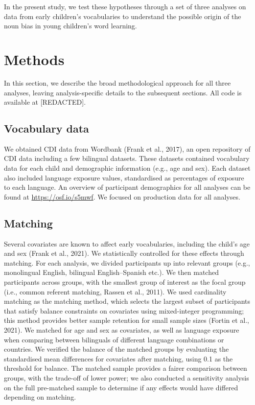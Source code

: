 \documentclass[10pt, letterpaper]{article}
\begin{document}
In the present study, we test these hypotheses through a set of three
analyses on data from early children's vocabularies to understand the
possible origin of the noun bias in young children's word learning.

\section{Methods}\label{methods}

In this section, we describe the broad methodological approach for all
three analyses, leaving analysis-specific details to the subsequent
sections. All code is available at {[}REDACTED{]}.

\subsection{Vocabulary data}\label{vocabulary-data}

We obtained CDI data from Wordbank (Frank et al., 2017), an open
repository of CDI data including a few bilingual datasets. These
datasets contained vocabulary data for each child and demographic
information (e.g., age and sex). Each dataset also included language
exposure values, standardised as percentages of exposure to each
language. An overview of participant demographics for all analyses can
be found at
\href{https://osf.io/s5mwf?view_only=a6e76ebe23b6422d8e1f90c1093da9db}{https://osf.io/s5mwf}.
We focused on production data for all analyses.

\subsection{Matching}\label{matching}

Several covariates are known to affect early vocabularies, including the
child's age and sex (Frank et al., 2021). We statistically controlled
for these effects through matching. For each analysis, we divided
participants up into relevant groups (e.g., monolingual English,
bilingual English--Spanish etc.). We then matched participants across
groups, with the smallest group of interest as the focal group (i.e.,
common referent matching, Rassen et al., 2011). We used cardinality
matching as the matching method, which selects the largest subset of
participants that satisfy balance constraints on covariates using
mixed-integer programming; this method provides better sample retention
for small sample sizes (Fortin et al., 2021). We matched for age and sex
as covariates, as well as language exposure when comparing between
bilinguals of different language combinations or countries. We verified
the balance of the matched groups by evaluating the standardised mean
differences for covariates after matching, using 0.1 as the threshold
for balance. The matched sample provides a fairer comparison between
groups, with the trade-off of lower power; we also conducted a
sensitivity analysis on the full pre-matched sample to determine if any
effects would have differed depending on matching.
\end{document}
